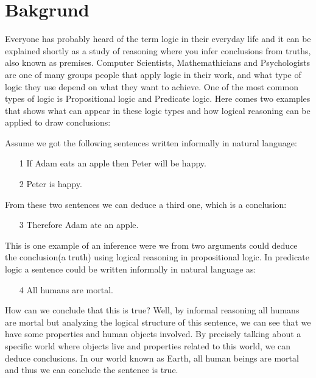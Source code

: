 \section{Bakgrund}

Everyone has probably heard of the term logic in their everyday life and it can be explained shortly as a study of reasoning where you infer conclusions from truths, also known as premises.
Computer Scientists, Mathemathicians and Psychologists are one of many groups people that apply logic in their work, and what type of logic they use depend on what they want to achieve. One of the most
common types of logic is Propositional logic and Predicate logic. Here comes two examples that shows what can appear in these logic types and how logical reasoning can be applied to draw conclusions:


Assume we got the following sentences written informally in natural language:

\begin{itemize}
    \item [1] If Adam eats an apple then Peter will be happy.
    \item [2] Peter is happy.
\end{itemize}


 \noindent From these two sentences we can deduce a third one, which is a conclusion:

 \begin{itemize}
    \item [3] Therefore Adam ate an apple.
\end{itemize}

\noindent This is one example of an inference were we from two arguments could deduce the conclusion(a truth) using logical reasoning in propositional logic. In predicate logic a sentence could be written informally in natural language as:

\begin{itemize}
    \item [4] All humans are mortal. 
\end{itemize}

\noindent How can we conclude that this is true? Well, by informal reasoning all humans are mortal but analyzing the logical structure of this sentence, we can see that we have some properties and human objects involved. By precisely talking about
a specific world where objects live and properties related to this world, we can deduce conclusions. In our world known as Earth, all human beings are mortal and thus we can conclude the sentence is true. 

